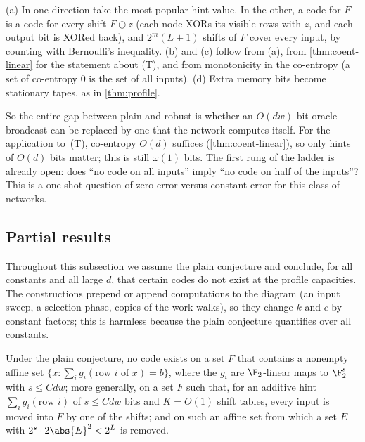 \begin{outline}
(a) In one direction take the most popular hint value. In the other, a code for $F$ is a code for
every shift $F\oplus z$ (each node XORs its visible rows with $z$, and each output bit is XORed back),
and $2^m(L+1)$ shifts of $F$ cover every input, by counting with Bernoulli's inequality. (b) and (c)
follow from (a), from \cref{thm:coent-linear} for the statement about (T), and from monotonicity in the
co-entropy (a set of co-entropy $0$ is the set of all inputs). (d) Extra memory bits become stationary tapes, as in \cref{thm:profile}.
\end{outline}

So the entire gap between plain and robust is whether an $O(dw)$-bit oracle broadcast can be
replaced by one that the network computes itself. For the application to~(T), co-entropy $O(d)$
suffices (\cref{thm:coent-linear}), so only hints of $O(d)$ bits matter; this is still $\omega(1)$
bits. The first rung of the ladder is already open: does ``no code on all inputs'' imply ``no code
on half of the inputs''? This is a one-shot question of zero error versus constant error for this
class of networks.

\subsection{Partial results}

Throughout this subsection we assume the plain conjecture  and conclude, for all
constants and all large $d$, that certain codes do not exist at the profile capacities. The
constructions prepend or append computations to the diagram (an input sweep, a selection phase,
copies of the work walks), so they change $k$ and $c$ by constant factors; this is harmless because
the plain conjecture quantifies over all constants.

\begin{theorem}\label{thm:pr-affine}
Under the plain conjecture, no code exists on a set $F$ that contains a nonempty affine set
$\{x:\sum_ig_i(\text{row }i\text{ of }x)=b\}$, where the $g_i$ are $\F_2$-linear maps to $\F_2^s$ with
$s\le Cdw$; more generally, on a set $F$ such that, for an additive hint $\sum_ig_i(\text{row }i)$ of
$s\le Cdw$ bits and $K=O(1)$ shift tables, every input is moved into $F$ by one of the shifts; and on
such an affine set from which a set $E$ with $2^s\cdot2\abs{E}^2<2^L$ is removed.
\end{theorem}

